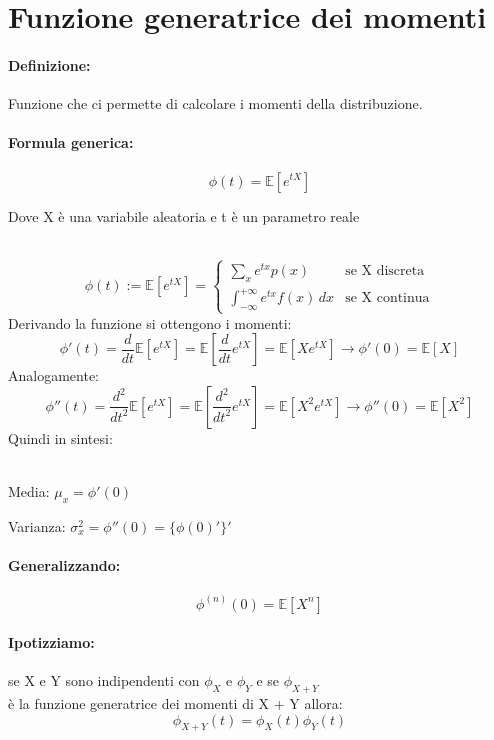 \documentclass[]{article}
\newcommand{\ev}{\mathbb{E}[X]}
\renewcommand{\ev}[1]{\mathbb{E}[#1]}
\newcommand{\definizione}{\paragraph{Definizione:}}
\newcommand{\formula}{\paragraph{Formula generica:}}
\begin{document}
    \newpage
    \section{Funzione generatrice dei momenti}
    \definizione Funzione che ci permette di calcolare i momenti della distribuzione.
    \formula \[ \phi(t) = \ev{e^{tX}}\]
    \centerline{Dove X è una variabile aleatoria e t è un parametro reale} \\
    \begin{equation*}
        \phi(t) := \ev{e^{tX}} = 
        \displaystyle
        \begin{cases}
            \displaystyle \sum_{x}^{} e^{tx}p(x) & \text{se X discreta} \\
            \displaystyle \int_{-\infty}^{+\infty} e^{tx} f(x) \, dx & \text{se X continua}
        \end{cases}
    \end{equation*}
    \linebreak[10]
    Derivando la funzione si ottengono i momenti:
    \[ \phi'(t) = \frac{d}{dt} \ev{e^{tX}} = \ev{\frac{d}{dt} e^{tX}} = \ev{Xe^{tX}} \longrightarrow \phi'(0) = \ev{X}\]
    \linebreak[10]
    Analogamente:
    \[ \phi''(t) = \frac{d^2}{dt^2} \ev{e^{tX}} = \ev{\frac{d^2}{dt^2} e^{tX}} = \ev{X^2e^{tX}} \longrightarrow \phi''(0) = \ev{X^2} \]
    Quindi in sintesi: \\ \\
    \begin{minipage}{0.45\linewidth}
        Media:
        $ \mu_x = \phi'(0) $
    \end{minipage}
    \begin{minipage}{0.45\linewidth}
        Varianza:
        $ \sigma^{2}_x = \phi''(0) = \{\phi(0)'\}' $
    \end{minipage}


    \paragraph{Generalizzando:} \[ \phi^{(n)}(0) = \ev{X^n} \]

    \paragraph{Ipotizziamo:} se X e Y sono indipendenti con $\phi_X$ e $\phi_Y$ e se $\phi_{X + Y}$ \\
    è la funzione generatrice dei momenti di X + Y allora:
    \[ \phi_{X + Y}(t) = \phi_X(t) \phi_Y(t) \]
\end{document}
